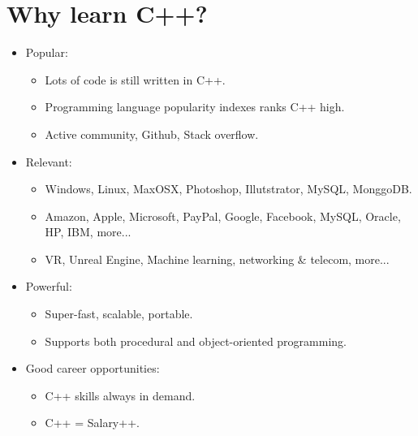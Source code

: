 \section{Why learn C++?}
\begin{itemize}
    \item Popular: 
        \begin{itemize}
            \item Lots of code is still written in C++.
            \item Programming language popularity indexes ranks C++ high.
            \item Active community, Github, Stack overflow.
        \end{itemize}

    \item Relevant: 
        \begin{itemize}
            \item Windows, Linux, MaxOSX, Photoshop, Illutstrator, MySQL, MonggoDB.
            \item Amazon, Apple, Microsoft, PayPal, Google, Facebook, MySQL, Oracle, HP, IBM, more... 
            \item VR, Unreal Engine, Machine learning, networking \& telecom, more...
        \end{itemize}
    
    \item Powerful: 
        \begin{itemize}
            \item Super-fast, scalable, portable.
            \item Supports both procedural and object-oriented programming.
        \end{itemize}
    
    \item Good career opportunities:
        \begin{itemize}
            \item C++ skills always in demand.
            \item C++ = Salary++.
        \end{itemize}
\end{itemize}



